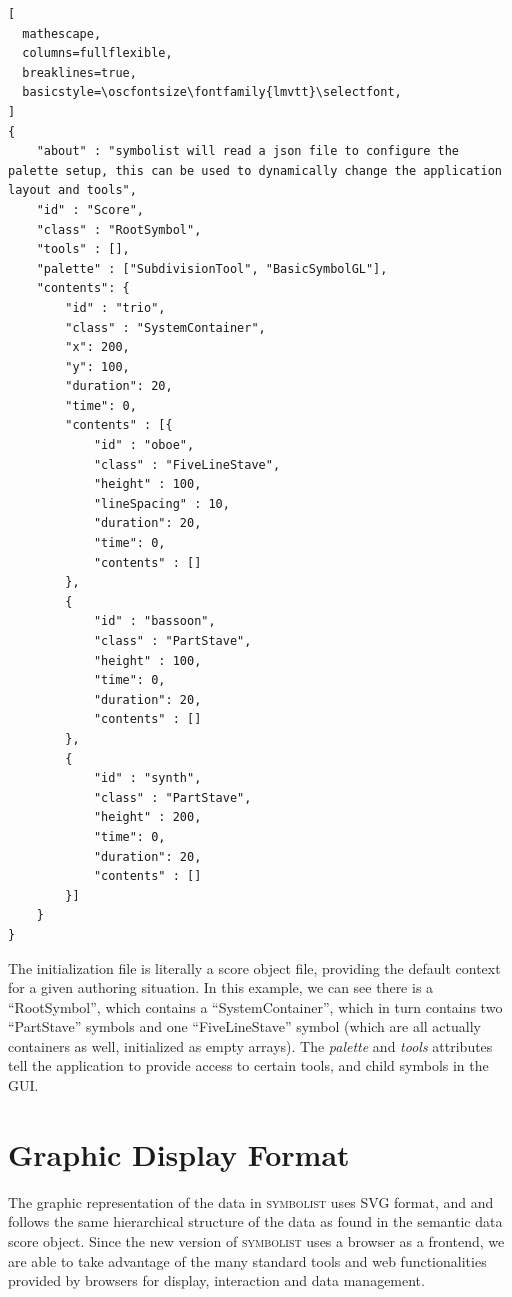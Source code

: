 \documentclass{article}
\def\symbolist{\textsc{symbolist}\xspace}
\def\oscfontsize{\footnotesize}
\begin{document}
\begin{minipage}{\linewidth}
\begin{lstlisting}[
  mathescape,
  columns=fullflexible,
  breaklines=true,
  basicstyle=\oscfontsize\fontfamily{lmvtt}\selectfont,
]
{
    "about" : "symbolist will read a json file to configure the palette setup, this can be used to dynamically change the application layout and tools",
    "id" : "Score",
    "class" : "RootSymbol",
    "tools" : [],
    "palette" : ["SubdivisionTool", "BasicSymbolGL"],
    "contents": { 
        "id" : "trio",
        "class" : "SystemContainer",
        "x": 200,
        "y": 100,
        "duration": 20,
        "time": 0,
        "contents" : [{
            "id" : "oboe",
            "class" : "FiveLineStave",
            "height" : 100,
            "lineSpacing" : 10,
            "duration": 20,
            "time": 0,
            "contents" : []
        },
        {
            "id" : "bassoon",
            "class" : "PartStave",
            "height" : 100,
            "time": 0,
            "duration": 20,
            "contents" : []
        },
        {
            "id" : "synth",
            "class" : "PartStave",
            "height" : 200,
            "time": 0,
            "duration": 20,
            "contents" : []
        }]
    }
}
\end{lstlisting}
\end{minipage}

The initialization file is literally a score object file, providing the default context for a given authoring situation. In this example, we can see there is a ``RootSymbol'', which contains a ``SystemContainer'', which in turn contains two ``PartStave'' symbols and one ``FiveLineStave'' symbol (which are all actually containers as well, initialized as empty arrays). The \textit{palette} and \textit{tools} attributes tell the application to provide access to certain tools, and child symbols in the GUI.

\section{Graphic Display Format}\label{graphic_display_format}

The graphic representation of the data in \symbolist uses SVG format, and and follows the same hierarchical structure of the data as found in the semantic data score object.
Since the new version of \symbolist uses a browser as a frontend, we are able to take advantage of the many standard tools and web functionalities provided by browsers for display, interaction and data management.
\end{document}
